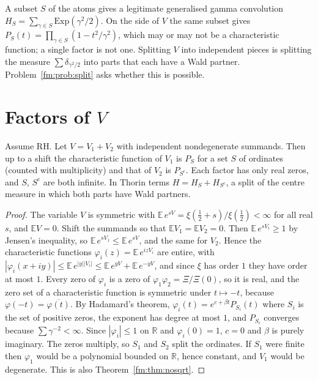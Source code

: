 A subset $S$ of the atoms gives a legitimate generalised gamma convolution $H_S=\sum_{\gamma\in S}\mathrm{Exp}(\gamma^2/2)$. On the side of $V$ the same subset gives $P_S(t)=\prod_{\gamma\in S}(1-t^2/\gamma^2)$, which may or may not be a characteristic function; a single factor is not one. Splitting $V$ into independent pieces is splitting the measure $\sum\delta_{\gamma^2/2}$ into parts that each have a Wald partner. Problem~\ref{fm:prob:split} asks whether this is possible.

\section{Factors of \texorpdfstring{$V$}{V}}\label{ap:sec:factor}

\begin{proposition}\label{ap:prop:factor}
Assume RH. Let $V=V_1+V_2$ with independent nondegenerate summands. Then up to a shift the characteristic function of $V_1$ is $P_S$ for a set $S$ of ordinates (counted with multiplicity) and that of $V_2$ is $P_{S^c}$. Each factor has only real zeros, and $S$, $S^c$ are both infinite. In Thorin terms $H=H_S+H_{S^c}$, a split of the centre measure in which both parts have Wald partners.
\end{proposition}

\begin{proof}
The variable $V$ is symmetric with $\mathbb E\,e^{sV}=\xi(\frac12+s)/\xi(\frac12)<\infty$ for all real $s$, and $\mathbb E V=0$. Shift the summands so that $\mathbb E V_1=\mathbb E V_2=0$. Then $\mathbb E\,e^{sV_i}\ge1$ by Jensen's inequality, so $\mathbb E\,e^{sV_1}\le\mathbb E\,e^{sV}$, and the same for $V_2$. Hence the characteristic functions $\varphi_i(z)=\mathbb E\,e^{izV_i}$ are entire, with $|\varphi_i(x+iy)|\le\mathbb E\,e^{|y||V_i|}\le\mathbb E\,e^{yV}+\mathbb E\,e^{-yV}$, and since $\xi$ has order $1$ they have order at most $1$. Every zero of $\varphi_i$ is a zero of $\varphi_1\varphi_2=\Xi/\Xi(0)$, so it is real, and the zero set of a characteristic function is symmetric under $t\mapsto-t$, because $\varphi(-t)=\overline{\varphi(t)}$. By Hadamard's theorem, $\varphi_i(t)=e^{c+\beta t}P_{S_i}(t)$ where $S_i$ is the set of positive zeros, the exponent has degree at most $1$, and $P_{S_i}$ converges because $\sum\gamma^{-2}<\infty$. Since $|\varphi_i|\le1$ on $\mathbb R$ and $\varphi_i(0)=1$, $c=0$ and $\beta$ is purely imaginary. The zeros multiply, so $S_1$ and $S_2$ split the ordinates. If $S_1$ were finite then $\varphi_1$ would be a polynomial bounded on $\mathbb R$, hence constant, and $V_1$ would be degenerate. This is also Theorem~\ref{fm:thm:nosqrt}.
\end{proof}


